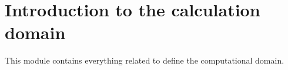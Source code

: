 
\section{Introduction to the calculation domain}

\vspace{0.5cm}

This module contains everything related to define the computational
domain.

\vspace{0.5cm}




